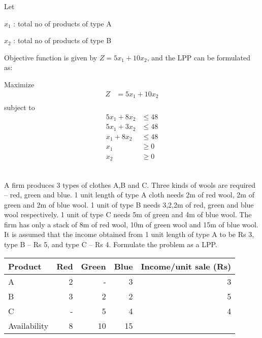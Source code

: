 \documentclass[12pt]{article}
\begin{document}
Let 

$x_1$ : total no of products of type A

$x_2$ : total no of products of type B

Objective function is given by $Z=5x_1 + 10x_2$, and the LPP can be formulated as:

Maximize
\begin{align*}
Z           & =5x_1 + 10x_2 \\
\end{align*}
subject to
\begin{align*}
5x_1 + 8x_2 & \le 48        \\
5x_1 + 3x_2 & \le 48        \\
x_1 + 8x_2  & \le 48        \\
x_1         & \ge 0         \\
x_2         & \ge 0         \\
\end{align*}
\subsection{}

A firm produces 3 types of clothes A,B and C. Three kinds of wools are required -- red, green and blue. 1 unit length of type A cloth needs 2m of red wool, 2m of green and 2m of blue wool. 1 unit of type B needs 3,2,2m of red, green and blue wool respectively. 1 unit of type C needs 5m of green and 4m of blue wool. The firm has only a stack of 8m of red wool, 10m of green wool and 15m of blue wool. It is assumed that the income obtained from 1 unit length of type A to be Rs 3, type B -- Rs 5, and type C -- Rs 4. Formulate the problem as a LPP.

\begin{center}
\begin{tabular}{lrrrr}
\hline
 Product       &  Red  &  Green  &  Blue  &  Income/unit sale (Rs)  \\
\hline
 A             &    2  &      -  &     3  &                      3  \\
 B             &    3  &      2  &     2  &                      5  \\
 C             &    -  &      5  &     4  &                      4  \\
\hline
 Availability  &    8  &     10  &    15  &                         \\
\hline
\end{tabular}
\end{center}
\end{document}
